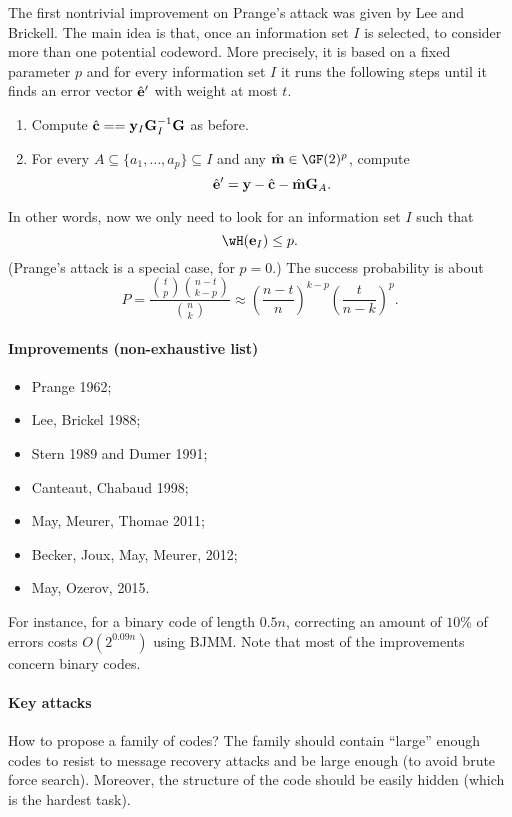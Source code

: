 \documentclass[a4paper, 11pt, openany]{book}
\begin{document}
The first nontrivial improvement on Prange's attack was given by Lee and Brickell. The main idea is that, once an information set $I$ is selected, to consider more than one potential codeword. More precisely, it is based on a fixed parameter $p$ and for every information set $I$ it runs the following steps until it finds an error vector $\hat{\bf e}'$ with weight at most $t$.
\begin{enumerate}
    \item Compute $\hat{\bf c} = = {\bf y}_I {\bf G}_I^{-1} {\bf G}$ as before.

    \item For every $A \subseteq \{a_1, \dots, a_p \} \subseteq I$ and any $\hat{\bf m} \in \GF(2)^p$, compute
    \[
        \hat{\bf e}' = {\bf y} - \hat{\bf c} - \hat{\bf m}{\bf G}_A.
    \]
\end{enumerate}
In other words, now we only need to look for an information set $I$ such that
\[
    \wH({\bf e}_I) \le p.
\]
(Prange's attack is a special case, for $p=0$.) The success probability is about
\[
    P = \frac{ \binom{t}{p} \binom{n-t}{k-p} }{ \binom{n}{k} } \approx \left( \frac{n-t}{n} \right)^{k-p} \left( \frac{t}{n-k} \right)^p.
\]


\paragraph{Improvements (non-exhaustive list)}
\begin{itemize}
\item Prange 1962;
\item Lee, Brickel 1988;
\item Stern 1989 and Dumer 1991;
\item Canteaut, Chabaud 1998;
\item May, Meurer, Thomae 2011;
\item Becker, Joux, May, Meurer, 2012;
\item May, Ozerov, 2015.
\end{itemize}

For instance, for a binary code of length $0.5n$, correcting an amount of $10$\% of errors costs $O(2^{0.09n})$ using BJMM. Note that most of the improvements concern binary codes.


\paragraph{Key attacks}
How to propose a family of codes? The family should contain ``large'' enough codes to resist to message recovery attacks and be large enough (to avoid brute force search). Moreover, the structure of the code should be easily hidden (which is the hardest task).
\end{document}
